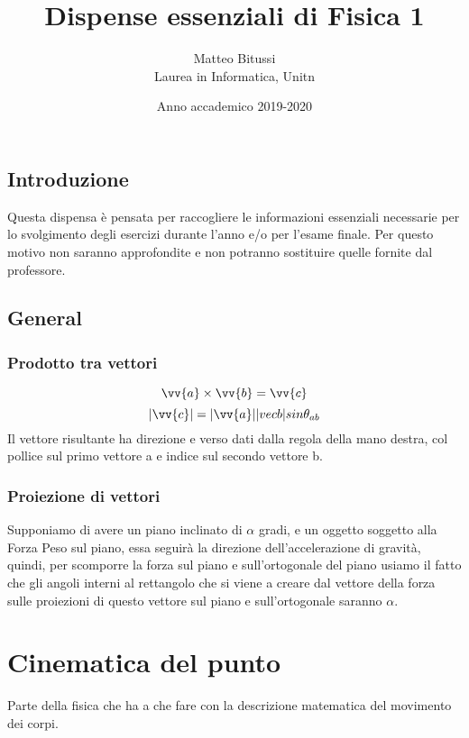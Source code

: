 \documentclass[a4paper]{report}
\title{Dispense essenziali di Fisica 1}
\author{Matteo Bitussi \\ Laurea in Informatica, Unitn}
\date{Anno accademico 2019-2020}
\begin{document}
  \maketitle

  \tableofcontents

  \section*{Introduzione}
  Questa dispensa è pensata per raccogliere le informazioni essenziali necessarie per lo svolgimento degli esercizi durante l'anno e/o per l'esame finale. Per questo motivo non saranno approfondite e non potranno sostituire quelle fornite dal professore.

  \section*{General}
  \subsection{Prodotto tra vettori}
  $$ \vv{a} \times \vv{b} = \vv{c} $$
  $$ |\vv{c}| = |\vv{a}||vec{b}| sin \theta_{ab} $$
  Il vettore risultante ha direzione e verso dati dalla regola della mano destra, col pollice sul primo vettore a e indice sul secondo vettore b.

  \subsection{Proiezione di vettori}
  Supponiamo di avere un piano inclinato di $\alpha$ gradi, e un oggetto soggetto alla Forza Peso sul piano, essa seguirà la direzione dell'accelerazione di gravità, quindi, per scomporre la forza sul piano e sull'ortogonale del piano usiamo il fatto che gli angoli interni al rettangolo che si viene a creare dal vettore della forza sulle proiezioni di questo vettore sul piano e sull'ortogonale saranno $\alpha$.

  \chapter{Cinematica del punto}
  Parte della fisica che ha a che fare con la descrizione matematica del movimento dei corpi.
\end{document}
